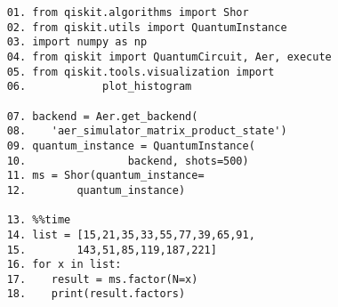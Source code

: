 \begin{lstlisting}
    01. from qiskit.algorithms import Shor
    02. from qiskit.utils import QuantumInstance
    03. import numpy as np
    04. from qiskit import QuantumCircuit, Aer, execute
    05. from qiskit.tools.visualization import
    06.            plot_histogram

    07. backend = Aer.get_backend(
    08.    'aer_simulator_matrix_product_state')
    09. quantum_instance = QuantumInstance(
    10.                backend, shots=500)
    11. ms = Shor(quantum_instance=
    12.        quantum_instance)

    13. %%time
    14. list = [15,21,35,33,55,77,39,65,91,
    15.        143,51,85,119,187,221]
    16. for x in list:
    17.    result = ms.factor(N=x)
    18.    print(result.factors)
\end{lstlisting}

